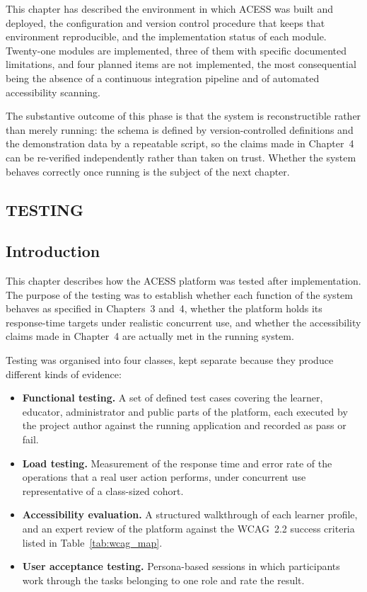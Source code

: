 \documentclass[12pt, oneside]{article} %
\begin{document}
This chapter has described the environment in which ACESS was built and deployed, the configuration and version control procedure that keeps that environment reproducible, and the implementation status of each module. Twenty-one modules are implemented, three of them with specific documented limitations, and four planned items are not implemented, the most consequential being the absence of a continuous integration pipeline and of automated accessibility scanning.

The substantive outcome of this phase is that the system is reconstructible rather than merely running: the schema is defined by version-controlled definitions and the demonstration data by a repeatable script, so the claims made in Chapter~4 can be re-verified independently rather than taken on trust. Whether the system behaves correctly once running is the subject of the next chapter.


\newpage
\vfill \null
\thispagestyle{empty}
\begin{center}
\section{TESTING}
\end{center}
\label{sec:testing}
\vspace{2cm}

\subsection{Introduction}

This chapter describes how the ACESS platform was tested after implementation. The purpose of the testing was to establish whether each function of the system behaves as specified in Chapters~3 and~4, whether the platform holds its response-time targets under realistic concurrent use, and whether the accessibility claims made in Chapter~4 are actually met in the running system.

Testing was organised into four classes, kept separate because they produce different kinds of evidence:

\begin{itemize}
    \item \textbf{Functional testing.} A set of defined test cases covering the learner, educator, administrator and public parts of the platform, each executed by the project author against the running application and recorded as pass or fail.
    \item \textbf{Load testing.} Measurement of the response time and error rate of the operations that a real user action performs, under concurrent use representative of a class-sized cohort.
    \item \textbf{Accessibility evaluation.} A structured walkthrough of each learner profile, and an expert review of the platform against the WCAG~2.2 success criteria listed in Table~\ref{tab:wcag_map}.
    \item \textbf{User acceptance testing.} Persona-based sessions in which participants work through the tasks belonging to one role and rate the result.
\end{itemize}
\end{document}
